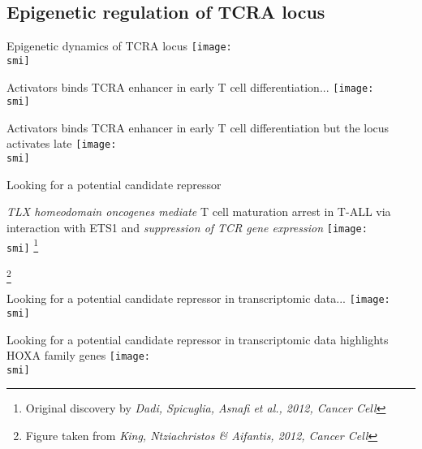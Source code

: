 \documentclass[10pt, usenames, dvipsnames]{beamer}
\def\smi{out/ln/updir/mw-gcthesis-oral/library.bib}
\newcommand\blfootnote[1]{%
  \begingroup
  \renewcommand\thefootnote{}\footnote{#1}%
  \addtocounter{footnote}{-1}%
  \endgroup
  }
\begin{document}
\subsection{Epigenetic regulation of TCRA locus}
\begin{frame}{Epigenetic dynamics of TCRA locus}
  \def\smi{out/ln/updir/mw-gcthesis-oral/ink/chromatin-states/genome-view/tcra.pdf}
  \texttt{[image: \\smi]}
\end{frame}
\begin{frame}{Activators binds TCRA enhancer in early T cell differentiation...}
  \def\smi{out/ln/updir/mw-gcthesis-oral/ink/ea-tf-mouse-chip.pdf}
  \texttt{[image: \\smi]}%
\end{frame}
\begin{frame}{Activators binds TCRA enhancer in early T cell differentiation but the locus activates late}
  \def\smi{out/ln/updir/mw-gcthesis-oral/ink/ea-tf-mouse.pdf}
  \texttt{[image: \\smi]}%
\end{frame}
\begin{frame}[standout]
  Looking for a potential candidate repressor
\end{frame}
\begin{frame}{\emph{TLX homeodomain oncogenes mediate} T cell maturation arrest in T-ALL via interaction with ETS1 and \emph{suppression of TCR\textalpha{} gene expression}}
  \def\smi{out/ln/updir/mw-gcthesis-oral/ink/King2012-fig1.png}
  \texttt{[image: \\smi]}
  \blfootnote{Original discovery by \textit{Dadi, Spicuglia, Asnafi et al., 2012, Cancer Cell}}
  \blfootnote{Figure taken from \textit{King, Ntziachristos \& Aifantis, 2012, Cancer Cell}}
\end{frame}\begin{frame}{Looking for a potential candidate repressor in transcriptomic data...}
  \def\smi{out/ln/updir/mw-gcthesis-oral/ink/rna-clusters/all.pdf}
  \texttt{[image: \\smi]}
\end{frame}
\begin{frame}{Looking for a potential candidate repressor in transcriptomic data highlights HOXA family genes}
  \def\smi{out/ln/updir/mw-gcthesis-oral/ink/rna-clusters/c13-tf.pdf}
  \texttt{[image: \\smi]}
\end{frame}
\end{document}
